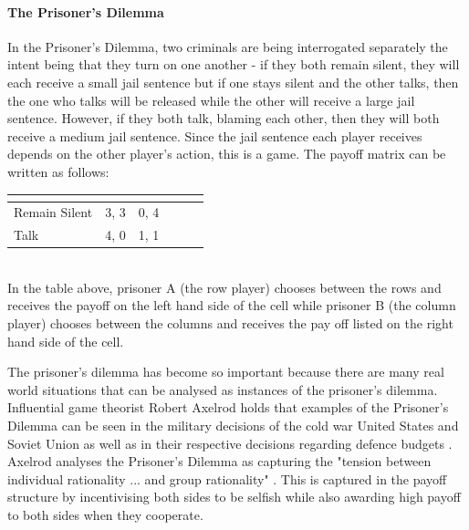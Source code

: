 \documentclass[11pt]{book}
\newcommand*{\np}{\par\noindent\newline}
\begin{document}
\paragraph{The Prisoner's Dilemma}
\np In the Prisoner's Dilemma, two criminals are being interrogated
separately the intent being that they turn on one another - if they both
remain silent, they will each receive a small jail sentence but if one
stays silent and the other talks, then the one who talks will be released while
the other will receive a large jail sentence. However, if they both
talk, blaming each other, then they will both receive a medium jail sentence.
Since the jail sentence each player receives depends on the other player's
action, this is a game. The payoff matrix can be written as follows:
\begin{center}
   \begin{tabular}{|l||*{5}{c|}}\hline
	\label{prisoner_payoff}
	\backslashbox{Prisoner A}{Prisoner B}
	&\makebox[7em]{Remain Silent}&\makebox[7em]{Talk}\\\hline\hline
	Remain Silent & 3, 3 & 0, 4\\\hline
	Talk & 4, 0 & 1, 1 \\\hline
	\end{tabular}
\end{center}\mbox{}\\
In the table above, prisoner A (the row player) chooses between the rows and
receives the payoff on the left hand side of the cell while prisoner B (the
column player) chooses between the columns and receives the pay off listed on
the right hand side of the cell.

\np The prisoner's dilemma has become so important because there are many real world situations that can be analysed as instances of the prisoner's dilemma. Influential game theorist Robert Axelrod holds that examples of the Prisoner's Dilemma can be seen in the military decisions of the cold war United States and Soviet Union as well as in their respective decisions regarding defence budgets \citep{axelrod_effective_1980}. 
Axelrod analyses the Prisoner's Dilemma as capturing the "tension between  individual rationality ... and group rationality" \cite[p. 4]{axelrod_effective_1980}. This is captured in the payoff structure by incentivising both sides to be selfish while also awarding high payoff to both sides when they cooperate.
\end{document}
